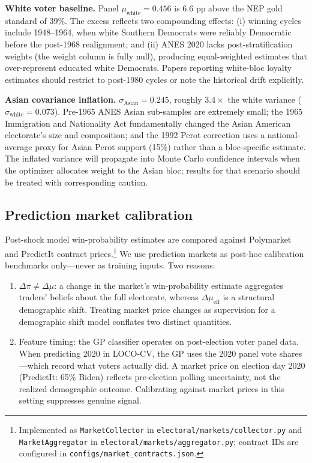 \documentclass[12pt, letterpaper]{article}
\theoremstyle{definition}
\newcommand{\mueff}{\mu_{\mathrm{eff}}}
\begin{document}
\textbf{White voter baseline.} Panel $\mu_{\text{white}} = 0.456$ is 6.6 pp
above the NEP gold standard of 39\%. The excess reflects two compounding
effects: (i) winning cycles include 1948--1964, when white Southern Democrats
were reliably Democratic before the post-1968 realignment; and (ii) ANES
2020 lacks post-stratification weights (the weight column is fully null),
producing equal-weighted estimates that over-represent educated white
Democrats. Papers reporting white-bloc loyalty estimates should restrict
to post-1980 cycles or note the historical drift explicitly.

\textbf{Asian covariance inflation.} $\sigma_{\text{Asian}} = 0.245$, roughly
$3.4\times$ the white variance ($\sigma_{\text{white}} = 0.073$). Pre-1965
ANES Asian sub-samples are extremely small; the 1965 Immigration and
Nationality Act fundamentally changed the Asian American electorate's size
and composition; and the 1992 Perot correction uses a national-average proxy
for Asian Perot support (15\%) rather than a bloc-specific estimate. The
inflated variance will propagate into Monte Carlo confidence intervals when
the optimizer allocates weight to the Asian bloc; results for that scenario
should be treated with corresponding caution.

\subsection{Prediction market calibration}

Post-shock model win-probability estimates are compared against Polymarket
and PredictIt contract prices.\footnote{Implemented as \texttt{MarketCollector}
in \texttt{electoral/markets/collector.py} and \texttt{MarketAggregator} in
\texttt{electoral/markets/aggregator.py}; contract IDs are configured in
\texttt{configs/market\_contracts.json}.} We use prediction markets as post-hoc
calibration benchmarks only---never as training inputs. Two reasons:

\begin{enumerate}
  \item $\Delta\pi \neq \Delta\mu$: a change in the market's win-probability
    estimate aggregates traders' beliefs about the full electorate, whereas
    $\Delta\mueff$ is a structural demographic shift. Treating market price
    changes as supervision for a demographic shift model conflates two
    distinct quantities.

  \item Feature timing: the GP classifier operates on post-election voter
    panel data. When predicting 2020 in LOCO-CV, the GP uses the 2020
    panel vote shares---which record what voters actually did. A market
    price on election day 2020 (PredictIt: 65\% Biden) reflects pre-election
    polling uncertainty, not the realized demographic outcome. Calibrating
    against market prices in this setting suppresses genuine signal.
\end{enumerate}
\end{document}

